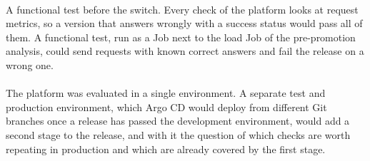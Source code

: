 \paragraph{} A functional test before the switch. Every check of the platform looks at request metrics, so a version that answers wrongly with a success status would pass all of them. A functional test, run as a Job next to the load Job of the pre-promotion analysis, could send requests with known correct answers and fail the release on a wrong one.

\paragraph{} The platform was evaluated in a single environment. A separate test and production environment, which Argo CD would deploy from different Git branches once a release has passed the development environment, would add a second stage to the release, and with it the question of which checks are worth repeating in production and which are already covered by the first stage.
